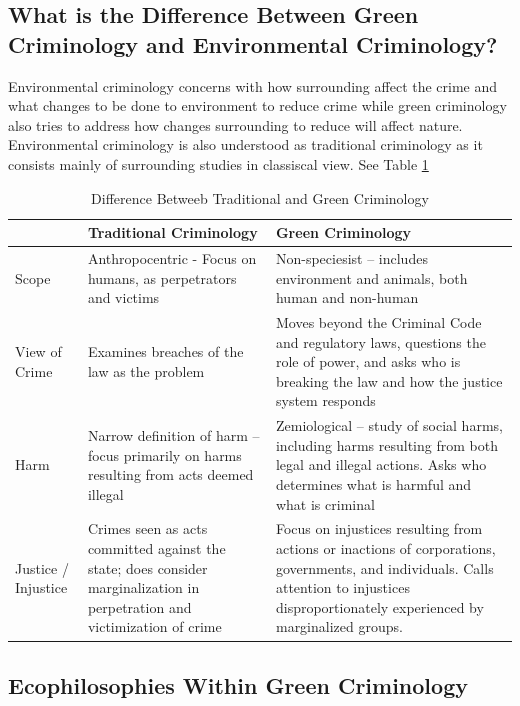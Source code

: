 \documentclass{article}
\begin{document}
\subsection{What is the Difference Between Green Criminology and Environmental Criminology?}

Environmental criminology concerns with how surrounding affect the crime and what changes to be done to environment to reduce crime while green criminology also tries to address how changes surrounding to reduce will affect nature. Environmental criminology is also understood as traditional criminology as it consists mainly of surrounding studies in classiscal view. See Table \ref{Trad_vs_Green}

\begin{table}
    \centering
    \begin{tabular}{|p{1.5cm}|p{6cm}|p{7.5cm}|}
        \hline
        \ & Traditional Criminology & Green Criminology \\
        \hline
        Scope & Anthropocentric - Focus on humans, as perpetrators and victims & Non-speciesist – includes environment and animals, both human and non-human \\
        \hline
        View of Crime & Examines breaches of the law as the problem & Moves beyond the Criminal Code and regulatory laws, questions the role of power, and asks who is breaking the law and how the justice system responds\\
        \hline
        Harm & Narrow definition of harm – focus primarily on harms resulting from acts deemed illegal & Zemiological – study of social harms, including harms resulting from both legal and illegal actions.  Asks who determines what is harmful and what is criminal\\
        \hline
        Justice / Injustice & Crimes seen as acts committed against the state; does consider marginalization in perpetration and victimization of crime & Focus on injustices resulting from actions or inactions of corporations, governments, and individuals.  Calls attention to injustices disproportionately experienced by marginalized groups.\\
        \hline
    \end{tabular}
    \caption{Difference Betweeb Traditional and Green Criminology}
    \label{Trad_vs_Green}
\end{table}

\subsection{Ecophilosophies Within Green Criminology}
\end{document}

